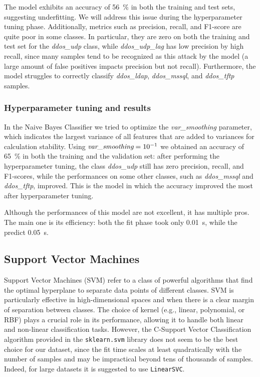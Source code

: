 \documentclass[acmlarge,nonacm]{acmart}
\begin{document}
The model exhibits an accuracy of \SI{56}{\percent} in both the training and test sets, suggesting underfitting. We will address this issue during the hyperparameter tuning phase. Additionally, metrics such as precision, recall, and F1-score are quite poor in some classes. In particular, they are zero on both the training and test set for the \emph{ddos\_udp} class, while \emph{ddos\_udp\_lag} has low precision by high recall, since many samples tend to be recognized as this attack by the model (a large amount of false positives impacts precision but not recall). Furthermore, the model struggles to correctly classify \emph{ddos\_ldap}, \emph{ddos\_mssql}, and \emph{ddos\_tftp} samples.

\subsubsection{Hyperparameter tuning and results} 
In the Naive Bayes Classifier we tried to optimize the \emph{var\_smoothing} parameter, which indicates the largest variance of all features that are added to variances for calculation stability. Using $\emph{var\_smoothing}=\num{e-1}$ we obtained an accuracy of \SI{65}{\percent} in both the training and the validation set: after performing the hyperparameter tuning, the class \emph{ddos\_udp} still has zero precision, recall, and F1-scores, while the performances on some other classes, such as \emph{ddos\_mssql} and \emph{ddos\_tftp}, improved. This is the model in which the accuracy improved the most after hyperparameter tuning.

Although the performances of this model are not excellent, it has multiple pros. The main one is its efficiency: both the fit phase took only \SI{0.01}{\second}, while the predict \SI{0.05}{\second}.

\subsection{Support Vector Machines}\label{sec:svm}
Support Vector Machines (SVM) refer to a class of powerful algorithms that find the optimal hyperplane to separate data points of different classes. SVM is particularly effective in high-dimensional spaces and when there is a clear margin of separation between classes. The choice of kernel (e.g., linear, polynomial, or RBF) plays a crucial role in its performance, allowing it to handle both linear and non-linear classification tasks. However, the C-Support Vector Classification algorithm provided in the \verb|sklearn.svm| library does not seem to be the best choice for our dataset, since the fit time scales at least quadratically with the number of samples and may be impractical beyond tens of thousands of samples. Indeed, for large datasets it is suggested to use \verb|LinearSVC|.
\end{document}

